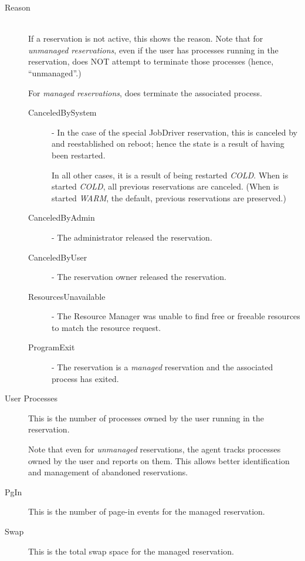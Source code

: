 \begin{description}
\item[Reason] \hfill \\


  If a reservation is not active, this shows the reason.  Note that for
  {\em unmanaged reservations}, even if the user has processes running in the
  reservation, {\DUCC} does NOT attempt to terminate those processes (hence, ``unmanaged''.)

  For {\em managed reservations}, {\DUCC} does terminate the associated process.

  \begin{description}
  \item[CanceledBySystem] - In the case of the special JobDriver reservation, this is
    canceled by {\DUCC} and reestablished on reboot; hence the state is a result of {\DUCC}
    having been restarted.

    In all other cases, it is a result of {\DUCC} being restarted {\em COLD}.  When
    {\DUCC} is started {\em COLD}, all previous reservations are canceled.  (When {\DUCC}
    is started {\em WARM}, the default, previous reservations are preserved.)
  \item[CanceledByAdmin] - The {\DUCC} administrator released the reservation. 
  \item[CanceledByUser] - The reservation owner released the reservation. 
  \item[ResourcesUnavailable] - The Resource Manager was unable to find free or freeable resources 
    to match the resource request. 
  \item[ProgramExit] - The reservation is a {\em managed} reservation and the associated
    process has exited.
  \end{description}

\item[User Processes] This is the number of processes owned by the user running in the reservation.  
  
  Note that even for {\em unmanaged} reservations, the {\DUCC} agent tracks processes owned
  by the user and reports on them.  This allows better identification and management of
  abandoned reservations.
          
\item[PgIn] This is the number of page-in events for the managed reservation.

\item[Swap] This is the total swap space for the managed reservation.


\end{description}
